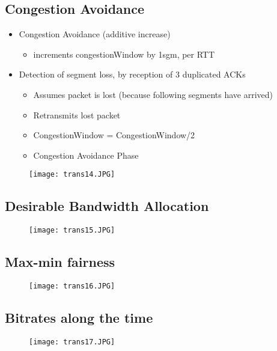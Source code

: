 \documentclass[../resumosRCOM.tex]{subfiles}
\begin{document}
\subsection{Congestion Avoidance}
\begin{itemize}
    \item Congestion Avoidance (additive increase)
    \begin{itemize}
        \item increments congestionWindow by 1sgm, per RTT
    \end{itemize}
    \item Detection of segment loss, by reception of 3 duplicated ACKs
    \begin{itemize}
        \item Assumes packet is lost (because following segments have arrived)
        \item Retransmits lost packet
        \item CongestionWindow = CongestionWindow/2
        \item Congestion Avoidance Phase
    \end{itemize}
\end{itemize}
\begin{figure}[H]
    \centering
    \texttt{[image: trans14.JPG]}
\end{figure}

\subsection{Desirable Bandwidth Allocation}
\begin{figure}[H]
    \centering
    \texttt{[image: trans15.JPG]}
\end{figure}

\subsection{Max-min fairness}
\begin{figure}[H]
    \centering
    \texttt{[image: trans16.JPG]}
\end{figure}

\subsection{Bitrates along the time}
\begin{figure}[H] 
    \centering
    \texttt{[image: trans17.JPG]}
\end{figure}
\end{document}
